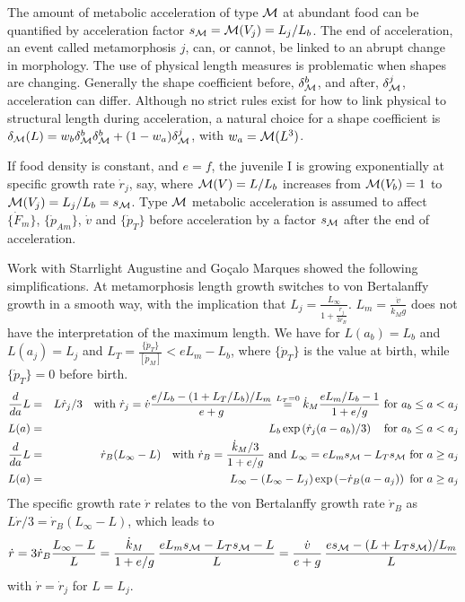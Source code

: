 The amount of metabolic acceleration of type $\cal M$ at abundant food can be quantified by acceleration factor $s_{\cal M} = {\cal M}(V_j) = L_j/ L_b$.
The end of acceleration, an event called metamorphosis $j$, can, or cannot, be linked to an abrupt change in morphology.
The use of physical length measures is problematic when shapes are changing.
Generally the shape coefficient before, $\delta_{\cal M}^b$, and after, $\delta_{\cal M}^j$, acceleration can differ.
Although no strict rules exist for how to link physical to structural length during acceleration, a natural choice for a shape coefficient is $\delta_{\cal M} (L) = w_b \delta_{\cal M}^b \delta_{\cal M}^b + (1 - w_a) \delta_{\cal M}^j$, with $w_a = {\cal M}(L^3)$.

If food density is constant, and $e = f$, the juvenile I is growing exponentially at specific growth rate $\dot{r}_j$, say, where ${\cal M}(V) = L/ L_b$ increases from ${\cal M}(V_b) = 1$ to ${\cal M}(V_j) = L_j/ L_b = s_{\cal M}$. 
Type $\cal M$ metabolic acceleration is assumed to affect $\{\dot{F}_m\}$, $\{\dot{p}_{Am}\}$, $\dot{v}$ and $\{\dot{p}_T\}$ before acceleration by a factor $s_{\cal M}$ after the end of acceleration.

Work with Starrlight Augustine and Go\c{c}alo Marques showed the following simplifications. 
At metamorphosis length growth switches to von Bertalanffy growth in a smooth way, with the implication that $L_j = \frac{L_\infty} {1 + \frac{\dot{r}_j} {3 \dot{r}_B}}$. 
$L_m = \frac{\dot{v}} {\dot{k}_M g}$ does not have the interpretation of the maximum length. 
We have for $L(a_b) = L_b$ and $L(a_j) = L_j$ and $L_T = \frac{\{\dot{p}_T\}} {[\dot{p}_M]} < e L_m - L_b$, where $\{\dot{p}_T\}$ is the value at birth, while $\{\dot{p}_T\} = 0$ before birth.
\begin{eqnarray*}
   \frac{d} {da} L &=& L \dot{r}_j/ 3 \quad \mbox{with } 
   \dot{r}_j = \dot{v} \frac{e/ L_b - (1 + L_T/ L_b)/ L_m} {e + g} \stackrel{L_T = 0}{=} \dot{k}_M \frac{e L_m/ L_b - 1} {1 + e/ g}
   \mbox{ for } a_b \le a < a_j 
   \\
   L(a) &=& L_b \exp \left( \dot{r}_j (a - a_b)/ 3 \right) 
   \quad \mbox{for } a_b \le a < a_j
   \\
   \frac{d} {da} L &=& \dot{r}_B (L_\infty - L) \quad \mbox{with } 
   \dot{r}_B = \frac{\dot{k}_M/ 3} {1 + e/ g} \mbox{ and } 
   L_\infty = e L_m s_{\cal M} - L_T s_{\cal M} \mbox{ for } a \ge a_j 
   \\
   L(a) &=& L_\infty - (L_\infty - L_j) \exp \left( - \dot{r}_B (a - a_j) \right)
   \mbox{ for } a \ge a_j
\end{eqnarray*}
The specific growth rate $\dot{r}$ relates to the von Bertalanffy growth rate $\dot{r}_B$ as $L \dot{r}/ 3 =  \dot{r}_B (L_\infty - L)$, which leads to
\[
   \dot{r} = 3 \dot{r}_B \frac{L_\infty - L} {L}
	         = \frac{\dot{k}_M} {1 + e/ g} \, \frac{e L_m s_{\cal M} - L_T s_{\cal M} - L} {L}
	         = \frac{\dot{v}} {e + g} \, \frac{e s_{\cal M} - (L + L_T s_{\cal M})/ L_m} {L}
\]
with $\dot{r} = \dot{r}_j$ for $L = L_j$.

